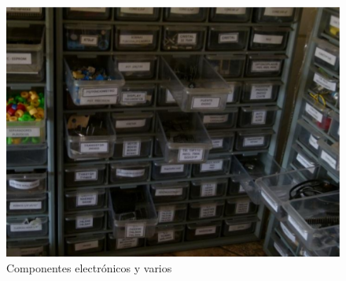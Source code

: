 \begin{itemize}
    \begin{figure}[h!]
      \centering
      \includegraphics[scale=0.5]{images/company/componentes-electronicos.png}
      \caption{Componentes electrónicos y varios}
      \label{fig:componentes-electronicos}
    \end{figure}
\end{itemize}
